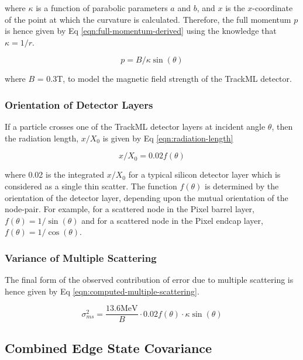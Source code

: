 where $\kappa$ is a function of parabolic parameters $a$ and $b$, and $x$ is the $x$-coordinate of the point at which the curvature is calculated. Therefore, the full momentum $p$ is hence given by Eq \eqref{eqn:full-momentum-derived} using the knowledge that $\kappa = 1/r$.

\begin{equation}
p = B / \kappa \sin(\theta)
\label{eqn:full-momentum-derived}
\end{equation}

where $B$ = 0.3T, to model the magnetic field strength of the TrackML detector.

\subsubsection{Orientation of Detector Layers}

If a particle crosses one of the TrackML detector layers at incident angle $\theta$, then the radiation length, $x/X_0$ is given by Eq \eqref{eqn:radiation-length}

\begin{equation}
x/X_0 = 0.02 f(\theta)
\label{eqn:radiation-length}
\end{equation}

where 0.02 is the integrated $x/X_0$ for a typical silicon detector layer which is considered as a single thin scatter. The function $f(\theta)$ is determined by the orientation of the detector layer, depending upon the mutual orientation of the node-pair. For example, for a scattered node in the Pixel barrel layer, $f(\theta) = 1 / \sin(\theta)$ and for a scattered node in the Pixel endcap layer, $f(\theta) = 1 / \cos(\theta)$.




\subsubsection{Variance of Multiple Scattering}

The final form of the observed contribution of error due to multiple scattering is hence given by Eq \eqref{eqn:computed-multiple-scattering}.

\begin{equation}
    \sigma_{ms}^{2} = \frac{13.6 \text{MeV}}{B} \cdot 0.02 f(\theta) \cdot \kappa \sin(\theta)
    \label{eqn:computed-multiple-scattering}
\end{equation}



\subsection{Combined Edge State Covariance}

